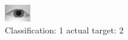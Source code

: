\begin{figure}[h!]
\begin{center}
\includegraphics[width=0.60\columnwidth]{figures/ID858_class_1_target_2.png}
\end{center}
\caption{ Classification: 1 actual target: 2}
\label{fig:ID858_class_1_target_2}
\end{figure}

